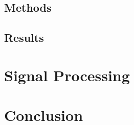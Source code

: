 \documentclass[11pt]{report}
\begin{document}

\subsection{Methods}


\subsection{Results}


\section{Signal Processing}


\section{Conclusion}




\end{document}
